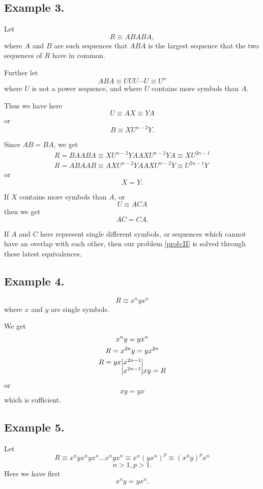 \subsection{Example 3.}

Let
$$R \equiv ABABA,$$
where $A$ and $B$ are such sequences that $ABA$ is the largest
sequence that the two sequences of $R$ have in common.

Further let
$$ABA \equiv UUU\cdots U \equiv U^n$$
where $U$ is not a power sequence, and where $U$ contains more symbols
than $A$.


Thus we have here
$$U \equiv AX \equiv YA$$
or
$$B \equiv X U^{n-2} Y.$$

Since $AB = BA$, we get
\begin{gather*}
R = BAABA \equiv XU^{n-2}YAAXU^{n-2}YA \equiv XU^{2n-1} \\
R = ABAAB \equiv AXU^{n-2}YAAXU^{n-2}Y \equiv U^{2n-1}Y
\end{gather*}
or
$$X = Y.$$

If $X$ contains more symbols than $A$, or 
$$U \equiv ACA$$
then we get
$$AC = CA.$$

If $A$ and $C$ here represent single different symbols, or sequences
which cannot have an overlap with each other, then our problem \ref{prob:II} is
solved through these latest equivalences.

\subsection{Example 4.}

$$R \equiv x^nyx^n$$
where $x$ and $y$ are single symbols.

We get
\begin{gather*}
x^ny = yx^n\\
R = x^{2n}y = yx^{2n}\\
\begin{array}{r@{}c@{}l}
R = yx & [x^{2n-1}] & \\
       & [x^{2n-1}] & xy = R
\end{array}
\end{gather*}
or
$$xy = yx$$
which is sufficient.


\subsection{Example 5.}

Let
$$R \equiv x^nyx^nyx^n \ldots x^nyx^n \equiv x^n(y x^n)^p \equiv
(x^ny)^px^n$$
$$n > 1, p >1.$$
Here we have first
$$x^ny = yx^n.$$

